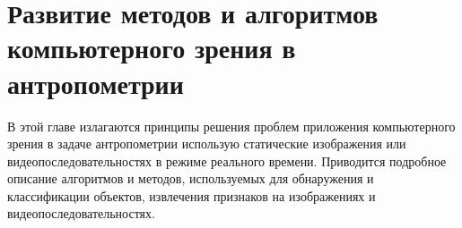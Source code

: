 \chapter{Развитие методов и алгоритмов компьютерного зрения в антропометрии} \label{chapt1}

В этой главе излагаются принципы решения проблем приложения компьютерного зрения в задаче антропометрии использую статические изображения или видеопоследовательностях в режиме реального времени. Приводится подробное описание алгоритмов и методов, используемых для обнаружения и классификации объектов, извлечения признаков на изображениях и видеопоследовательностях.








